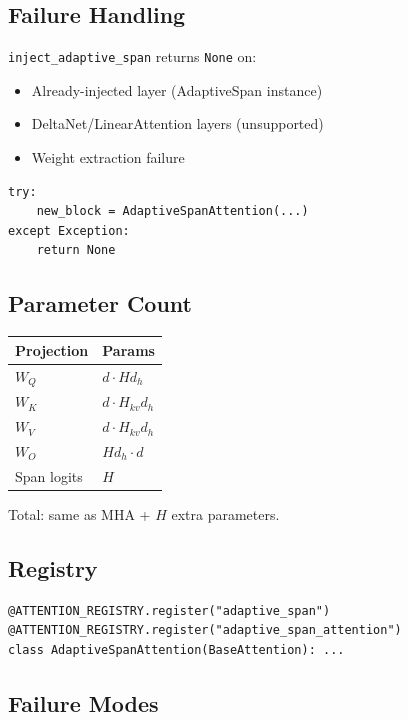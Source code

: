 \subsection{Failure Handling}

\texttt{inject\_adaptive\_span} returns \texttt{None} on:
\begin{itemize}
\item Already-injected layer (AdaptiveSpan instance)
\item DeltaNet/LinearAttention layers (unsupported)
\item Weight extraction failure

\end{itemize}
\begin{lstlisting}
try:
    new_block = AdaptiveSpanAttention(...)
except Exception:
    return None
\end{lstlisting}

\subsection{Parameter Count}

\begin{table}[H]
\centering
\small
\begin{tabular}{ll}
\toprule
\textbf{Projection} & \textbf{Params} \\
\midrule
$W_Q$ & $d \cdot H d_h$ \\
$W_K$ & $d \cdot H_{kv} d_h$ \\
$W_V$ & $d \cdot H_{kv} d_h$ \\
$W_O$ & $H d_h \cdot d$ \\
Span logits & $H$ \\
\bottomrule
\end{tabular}
\end{table}

Total: same as MHA + $H$ extra parameters.

\subsection{Registry}

\begin{lstlisting}
@ATTENTION_REGISTRY.register("adaptive_span")
@ATTENTION_REGISTRY.register("adaptive_span_attention")
class AdaptiveSpanAttention(BaseAttention): ...
\end{lstlisting}

\subsection{Failure Modes}

